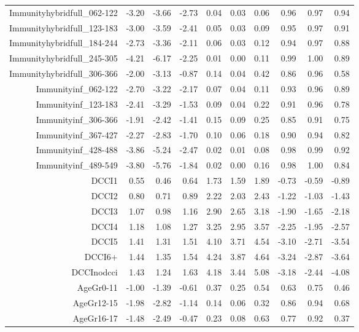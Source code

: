 \begin{table}[ht]
\begin{tabular}{rrrrrrrrrr}
  Immunityhybridfull\_062-122 & -3.20 & -3.66 & -2.73 & 0.04 & 0.03 & 0.06 & 0.96 & 0.97 & 0.94 \\ 
  Immunityhybridfull\_123-183 & -3.00 & -3.59 & -2.41 & 0.05 & 0.03 & 0.09 & 0.95 & 0.97 & 0.91 \\ 
  Immunityhybridfull\_184-244 & -2.73 & -3.36 & -2.11 & 0.06 & 0.03 & 0.12 & 0.94 & 0.97 & 0.88 \\ 
  Immunityhybridfull\_245-305 & -4.21 & -6.17 & -2.25 & 0.01 & 0.00 & 0.11 & 0.99 & 1.00 & 0.89 \\ 
  Immunityhybridfull\_306-366 & -2.00 & -3.13 & -0.87 & 0.14 & 0.04 & 0.42 & 0.86 & 0.96 & 0.58 \\ 
  Immunityinf\_062-122 & -2.70 & -3.22 & -2.17 & 0.07 & 0.04 & 0.11 & 0.93 & 0.96 & 0.89 \\ 
  Immunityinf\_123-183 & -2.41 & -3.29 & -1.53 & 0.09 & 0.04 & 0.22 & 0.91 & 0.96 & 0.78 \\ 
  Immunityinf\_306-366 & -1.91 & -2.42 & -1.41 & 0.15 & 0.09 & 0.25 & 0.85 & 0.91 & 0.75 \\ 
  Immunityinf\_367-427 & -2.27 & -2.83 & -1.70 & 0.10 & 0.06 & 0.18 & 0.90 & 0.94 & 0.82 \\ 
  Immunityinf\_428-488 & -3.86 & -5.24 & -2.47 & 0.02 & 0.01 & 0.08 & 0.98 & 0.99 & 0.92 \\ 
  Immunityinf\_489-549 & -3.80 & -5.76 & -1.84 & 0.02 & 0.00 & 0.16 & 0.98 & 1.00 & 0.84 \\ 
  DCCI1 & 0.55 & 0.46 & 0.64 & 1.73 & 1.59 & 1.89 & -0.73 & -0.59 & -0.89 \\ 
  DCCI2 & 0.80 & 0.71 & 0.89 & 2.22 & 2.03 & 2.43 & -1.22 & -1.03 & -1.43 \\ 
  DCCI3 & 1.07 & 0.98 & 1.16 & 2.90 & 2.65 & 3.18 & -1.90 & -1.65 & -2.18 \\ 
  DCCI4 & 1.18 & 1.08 & 1.27 & 3.25 & 2.95 & 3.57 & -2.25 & -1.95 & -2.57 \\ 
  DCCI5 & 1.41 & 1.31 & 1.51 & 4.10 & 3.71 & 4.54 & -3.10 & -2.71 & -3.54 \\ 
  DCCI6+ & 1.44 & 1.35 & 1.54 & 4.24 & 3.87 & 4.64 & -3.24 & -2.87 & -3.64 \\ 
  DCCInodcci & 1.43 & 1.24 & 1.63 & 4.18 & 3.44 & 5.08 & -3.18 & -2.44 & -4.08 \\ 
  AgeGr0-11 & -1.00 & -1.39 & -0.61 & 0.37 & 0.25 & 0.54 & 0.63 & 0.75 & 0.46 \\ 
  AgeGr12-15 & -1.98 & -2.82 & -1.14 & 0.14 & 0.06 & 0.32 & 0.86 & 0.94 & 0.68 \\ 
  AgeGr16-17 & -1.48 & -2.49 & -0.47 & 0.23 & 0.08 & 0.63 & 0.77 & 0.92 & 0.37 \\ 

\end{tabular}
\end{table}
